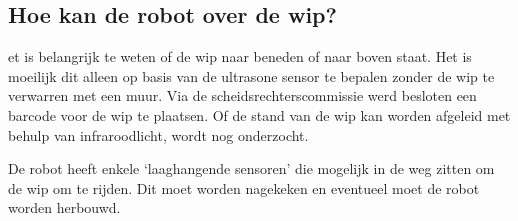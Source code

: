 \documentclass{peno}
\begin{document}

\subsection*{Hoe kan de robot over de wip?}
et is belangrijk te weten of de wip naar beneden of naar boven staat. Het is moeilijk dit alleen op basis van de ultrasone sensor te bepalen zonder de wip te verwarren met een muur. Via de scheidsrechterscommissie werd besloten een barcode voor de wip te plaatsen. Of de stand van de wip kan worden afgeleid met behulp van infraroodlicht, wordt nog onderzocht.

De robot heeft enkele `laaghangende sensoren' die mogelijk in de weg zitten om de wip om te rijden. Dit moet worden nagekeken en eventueel moet de robot worden herbouwd.



\end{document}
